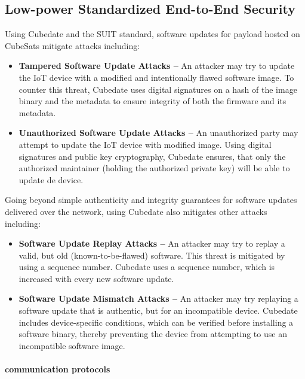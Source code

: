 \subsection{Low-power Standardized End-to-End Security}


Using Cubedate and the SUIT standard, software updates for payload hosted on CubeSats mitigate attacks including:

\begin{itemize}
\item {\bf Tampered Software Update Attacks –} An attacker may try to update the IoT device with a modified and intentionally flawed software image. To counter this threat, Cubedate uses digital signatures on a hash of the image binary and the metadata to ensure integrity of both the firmware and its metadata.

\item {\bf Unauthorized Software Update Attacks –} An unauthorized party may attempt to update the IoT device with modified image. Using digital signatures and public key cryptography, Cubedate ensures, that only the authorized maintainer (holding the authorized private key) will be able to update de device.
\end{itemize}

Going beyond simple authenticity and integrity guarantees for software updates delivered over the network, using Cubedate also mitigates other attacks including:
\begin{itemize}
\item {\bf Software Update Replay Attacks –} An attacker may try to replay a valid, but old (known-to-be-flawed) software. This threat is mitigated by using a sequence number. Cubedate uses a sequence number, which is increased with every new software update.

\item {\bf Software Update Mismatch Attacks –} An attacker may try replaying a software update that is authentic, but for an incompatible device. Cubedate includes device-specific conditions, which can be verified before installing a software binary, thereby preventing the device from attempting to use an incompatible software image.
\end{itemize}

\iffalse

\paragraph*{communication protocols}
